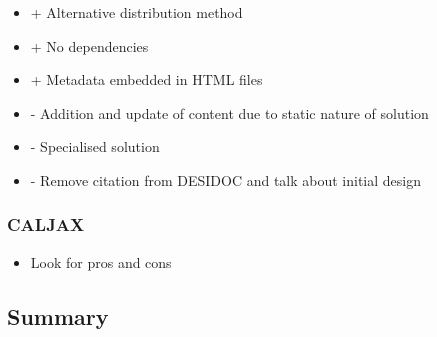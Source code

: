 \begin{itemize}
 \item + Alternative distribution method
 \item + No dependencies
 \item + Metadata embedded in HTML files
 \item - Addition and update of content due to static nature of solution
 \item - Specialised solution
 \item - Remove citation from DESIDOC and talk about initial design
\end{itemize}

\subsubsection{CALJAX}
\label{sec:background:related-work:prior-research:caljax}
%

\begin{itemize}
 \item Look for pros and cons
\end{itemize}

\subsection{Summary}
\label{sec:background:related-work:summary}